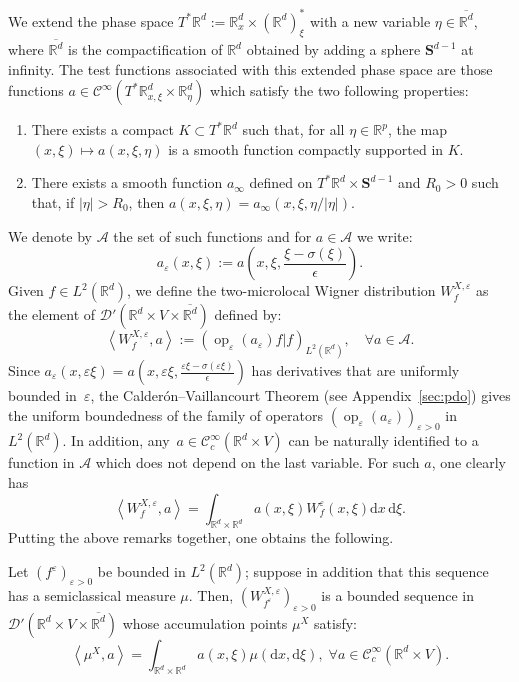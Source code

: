 \documentclass[AHL,Unicode,longabstracts]{cedram}
\DeclareMathOperator{\op}{op}
\newcommand*\R{{\mathbb R}}
\newcommand*\eps{\varepsilon}
\numberwithin{equation}{section}
\let\oldforall\forall
\renewcommand*{\forall}{\mathrel{\oldforall}}
\newcommand*{\dd}{\mathrm{d}}
\newcommand*{\dx}{\dd x}
\newcommand*{\dxi}{\dd \xi}
\begin{document}
We extend the phase space $T^*\R^d:=\R^d_x\times(\R^d)^*_\xi$ with a new variable $\eta\in \overline{ \R^d}$, where $\overline{\R^d}$ is the compactification of $\R^d$ obtained by adding a sphere $\mathbf{S}^{d-1}$ at infinity. The test functions associated with this extended phase space are those functions $a\in{\mathcal C}^\infty(T^*\R^d_{x,\xi}\times\R^d_\eta)$ which satisfy the two following properties:
\begin{enumerate}
\item \label{listsec4.1} There exists a compact $K \subset T^*\R^d$ such that, for all $\eta\in\R^p$, the map $(x,\xi)\mapsto a(x,\xi,\eta)$ is a smooth function compactly supported in $K$.
\item \label{listsec4.2}There exists a smooth function $a_\infty$ defined on $T^*\R^d\times\mathbf{S}^{d-1}$ and $R_0>0$ such that, if $|\eta|>R_0$, then $a(x,\xi,\eta)=a_\infty(x,\xi,\eta/|\eta|)$.
\end{enumerate}


We denote by $\mathcal{A}$ the set of such functions and for $a\in \mathcal{A}$ we write:
\begin{equation}\label{def:aeps}
a_\eps(x,\xi):=a\left(x,\xi,\frac{\xi-\sigma(\xi)}{\epsilon}\right).
\end{equation}
Given $f\in L^2(\R^d)$, we define the two-microlocal Wigner distribution $W^{X,\eps}_{f}$ as the element of $\mathcal{D}'(\R^d\times V\times \overline{\R^d})$ defined by:
\begin{equation}
\left\langle W^{X,\eps}_{f},a\right\rangle :=(\op_\eps(a_\eps) f|f)_{L^2(\R^d)},\quad \forall a\in {\mathcal A}.
\end{equation}
Since $a_\eps(x,\eps\xi) = a\left(x,\eps \xi,\frac{\eps \xi-\sigma(\eps\xi)}{\epsilon}\right)$ has derivatives that are uniformly bounded in~$\eps$, the Calderón--Vaillancourt Theorem (see Appendix~\ref{sec:pdo}) gives the uniform boundedness of the family of operators $(\op_\eps(a_\eps))_{\eps>0}$ in $L^2(\R^d)$. In addition, any~$a\in {\mathcal C}^\infty_c(\R^d\times V)$ can be naturally identified to a function in ${\mathcal A}$ which does not depend on the last variable. For such $a$, one clearly has
\[
\left\langle W^{X,\eps}_{f},a\right\rangle=\int_{\R^d\times\R^d}a(x,\xi)W^\eps_f(x,\xi)\dx\,\dxi.
\]
Putting the above remarks together, one obtains the following.

\begin{prop}\label{prop:2microdis}
Let $(f^\eps)_{\eps>0}$ be bounded in $L^2(\R^d)$; suppose in addition that this sequence has a semiclassical measure $\mu$. Then, $(W^{X,\eps}_{f^\eps})_{\eps>0}$ is a bounded sequence in $\mathcal{D}'(\R^d\times V\times \overline{\R^d})$ whose accumulation points $\mu^X$ satisfy:
\[
\left\langle \mu^{X},a\right\rangle=\int_{\R^d\times\R^d}a(x,\xi)\mu(\dx,\dxi),\;\forall a\in {\mathcal C}^\infty_c(\R^d\times V).
\]
\end{prop}
\end{document}
